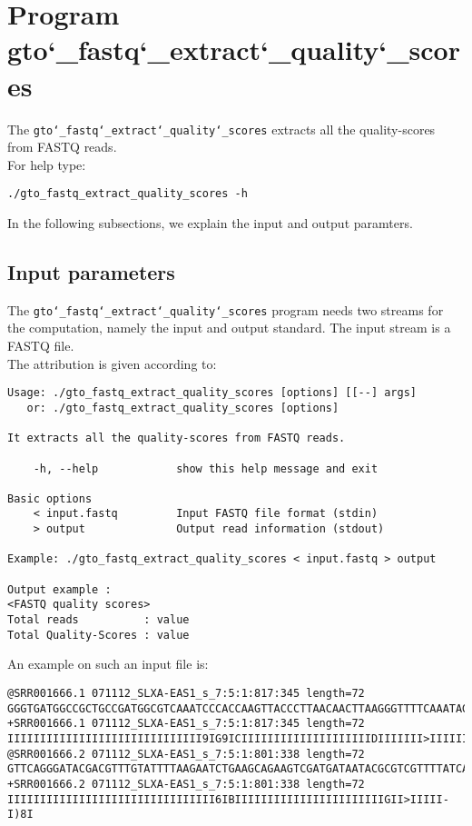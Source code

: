 \section{Program gto\char`_fastq\char`_extract\char`_quality\char`_scores}
The \texttt{gto\char`_fastq\char`_extract\char`_quality\char`_scores} extracts all the quality-scores from FASTQ reads.\\
For help type:
\begin{lstlisting}
./gto_fastq_extract_quality_scores -h
\end{lstlisting}
In the following subsections, we explain the input and output paramters.

\subsection*{Input parameters}

The \texttt{gto\char`_fastq\char`_extract\char`_quality\char`_scores} program needs two streams for the computation,
namely the input and output standard. The input stream is a FASTQ file.\\
The attribution is given according to:
\begin{lstlisting}
Usage: ./gto_fastq_extract_quality_scores [options] [[--] args]
   or: ./gto_fastq_extract_quality_scores [options]

It extracts all the quality-scores from FASTQ reads.

    -h, --help            show this help message and exit

Basic options
    < input.fastq         Input FASTQ file format (stdin)
    > output              Output read information (stdout)

Example: ./gto_fastq_extract_quality_scores < input.fastq > output

Output example :
<FASTQ quality scores>
Total reads          : value
Total Quality-Scores : value
\end{lstlisting}
An example on such an input file is:
\begin{lstlisting}
@SRR001666.1 071112_SLXA-EAS1_s_7:5:1:817:345 length=72
GGGTGATGGCCGCTGCCGATGGCGTCAAATCCCACCAAGTTACCCTTAACAACTTAAGGGTTTTCAAATAGA
+SRR001666.1 071112_SLXA-EAS1_s_7:5:1:817:345 length=72
IIIIIIIIIIIIIIIIIIIIIIIIIIIIII9IG9ICIIIIIIIIIIIIIIIIIIIIDIIIIIII>IIIIII/
@SRR001666.2 071112_SLXA-EAS1_s_7:5:1:801:338 length=72
GTTCAGGGATACGACGTTTGTATTTTAAGAATCTGAAGCAGAAGTCGATGATAATACGCGTCGTTTTATCAT
+SRR001666.2 071112_SLXA-EAS1_s_7:5:1:801:338 length=72
IIIIIIIIIIIIIIIIIIIIIIIIIIIIIIII6IBIIIIIIIIIIIIIIIIIIIIIIIGII>IIIII-I)8I
\end{lstlisting}

